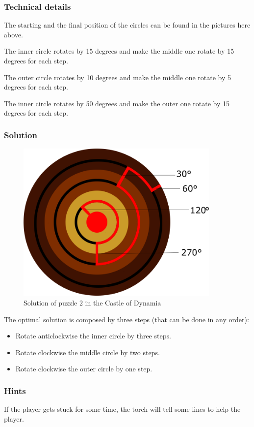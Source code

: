 \subsubsection*{Technical details}
The starting and the final position of the circles can be found in the pictures here above.

The inner circle rotates by 15 degrees and make the middle one rotate by 15 degrees for each step.

The outer circle rotates by 10 degrees and make the middle one rotate by 5 degrees for each step.

The inner circle rotates by 50 degrees and make the outer one rotate by 15 degrees for each step.

\subsubsection*{Solution}
\begin{figure}[H]
  \centering
  \includegraphics[width=10cm]{Images/Puzzles/castleOfDynamia2Solution}
  \caption{Solution of puzzle 2 in the Castle of Dynamia}
\end{figure}

The optimal solution is composed by three steps (that can be done in any order):
\begin{itemize}
	\item Rotate anticlockwise the inner circle by three steps.
	\item Rotate clockwise the middle circle by two steps.
	\item Rotate clockwise the outer circle by one step.
\end{itemize}

\subsubsection*{Hints}
If the player gets stuck for some time, the torch will tell some lines to help the player.

